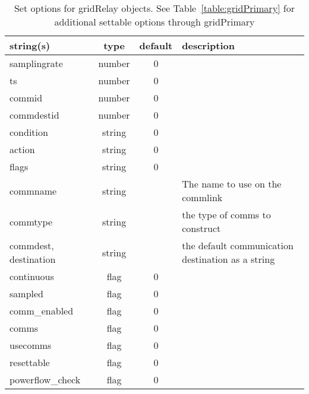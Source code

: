 \begin{table}[ht]
\centering
\begin{tabular}{p{5cm} c c p{7cm}}
\hline
string(s) & type & default & description \\
\hline
samplingrate & number & 0 & \\
ts & number & 0 & \\
commid & number & 0 & \\
commdestid & number & 0 & \\
condition & string & 0 & \\
action & string & 0 & \\
flags & string & 0 & \\
commname & string &  & The name to use on the commlink\\
commtype & string &  & the type of comms to construct\\
commdest, destination & string &  & the default communication destination as a string\\
continuous & flag & 0 & \\
sampled & flag & 0 & \\
comm\_enabled & flag & 0 & \\
comms & flag & 0 & \\
usecomms & flag & 0 & \\
resettable & flag & 0 & \\
powerflow\_check & flag & 0 & \\
\hline
\end{tabular}
\caption{Set options for gridRelay objects. See Table~\ref{table:gridPrimary} for additional settable options through gridPrimary}
\label{table:gridRelay}
\end{table}
